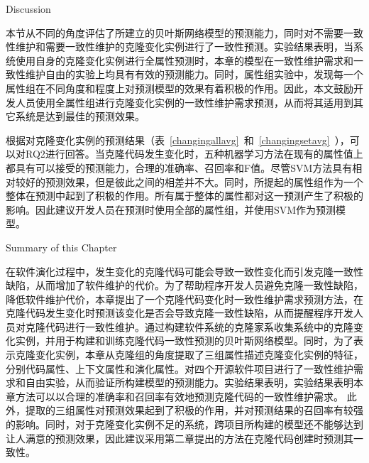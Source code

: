 {Discussion}

本节从不同的角度评估了所建立的贝叶斯网络模型的预测能力，同时对不需要一致性维护和需要一致性维护的克隆变化实例进行了一致性预测。实验结果表明，当系统使用自身的克隆变化实例进行全属性预测时，本章的模型在一致性维护需求和一致性维护自由的实验上均具有有效的预测能力。同时，属性组实验中，发现每一个属性组在不同角度和程度上对预测模型的效果有着积极的作用。因此，本文鼓励开发人员使用全属性组进行克隆变化实例的一致性维护需求预测，从而将其适用到其它系统是达到最佳的预测效果。

根据对克隆变化实例的预测结果（表~\ref{changingallavg}~和~\ref{changingsetavg}~），可以对RQ2进行回答。当克隆代码发生变化时，五种机器学习方法在现有的属性值上都具有可以接受的预测能力，合理的准确率、召回率和F值。尽管SVM方法具有相对较好的预测效果，但是彼此之间的相差并不大。同时，所提起的属性组作为一个整体在预测中起到了积极的作用。所有属于整体的属性都对这一预测产生了积极的影响。因此建议开发人员在预测时使用全部的属性组，并使用SVM作为预测模型。







{Summary of this Chapter}

在软件演化过程中，发生变化的克隆代码可能会导致一致性变化而引发克隆一致性缺陷，从而增加了软件维护的代价。为了帮助程序开发人员避免克隆一致性缺陷，降低软件维护代价，本章提出了一个克隆代码变化时一致性维护需求预测方法，在克隆代码发生变化时预测该变化是否会导致克隆一致性缺陷，从而提醒程序开发人员对克隆代码进行一致性维护。通过构建软件系统的克隆家系收集系统中的克隆变化实例，并用于构建和训练克隆代码一致性预测的贝叶斯网络模型。同时，为了表示克隆变化实例，本章从克隆组的角度提取了三组属性描述克隆变化实例的特征，分别代码属性、上下文属性和演化属性。对四个开源软件项目进行了一致性维护需求和自由实验，从而验证所构建模型的预测能力。实验结果表明，实验结果表明本章方法可以以合理的准确率和召回率有效地预测克隆代码的一致性维护需求。%
此外，提取的三组属性对预测效果起到了积极的作用，并对预测结果的召回率有较强的影响。同时，对于克隆变化实例不足的系统，跨项目所构建的模型还不能够达到让人满意的预测效果，因此建议采用第二章提出的方法在克隆代码创建时预测其一致性。

